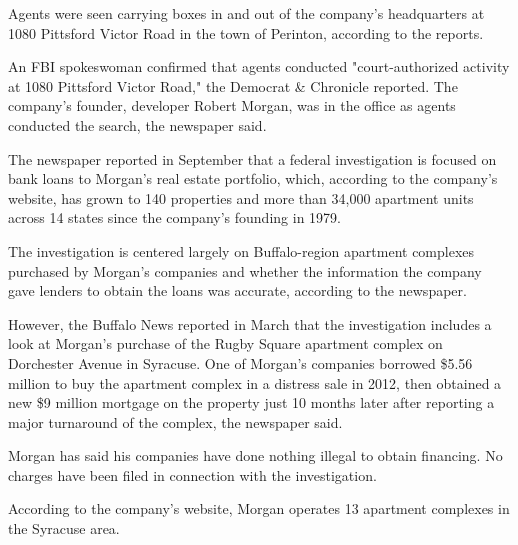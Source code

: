 \documentclass[../../main/main.tex]{subfiles}
\begin{document}
Agents were seen carrying boxes in and out of the company's headquarters at 1080 Pittsford Victor Road in the town of Perinton, according to the reports.

An FBI spokeswoman confirmed that agents conducted "court-authorized activity at 1080 Pittsford Victor Road," the Democrat \& Chronicle reported. The company's founder, developer Robert Morgan, was in the office as agents conducted the search, the newspaper said.

The newspaper reported in September that a federal investigation is focused on bank loans to Morgan's real estate portfolio, which, according to the company's website, has grown to 140 properties and more than 34,000 apartment units across 14 states since the company's founding in 1979.

The investigation is centered largely on Buffalo-region apartment complexes purchased by Morgan's companies and whether the information the company gave lenders to obtain the loans was accurate, according to the newspaper.

However, the Buffalo News reported in March that the investigation includes a look at Morgan's purchase of the Rugby Square apartment complex on Dorchester Avenue in Syracuse.  One of Morgan's companies borrowed \$5.56 million to buy the apartment complex in a distress sale in 2012, then obtained a new \$9 million mortgage on the property just 10 months later after reporting a major turnaround of the complex, the newspaper said.

Morgan has said his companies have done nothing illegal to obtain financing. No charges have been filed in connection with the investigation. 

According to the company's website, Morgan operates 13 apartment complexes in the Syracuse area.
\end{document}

